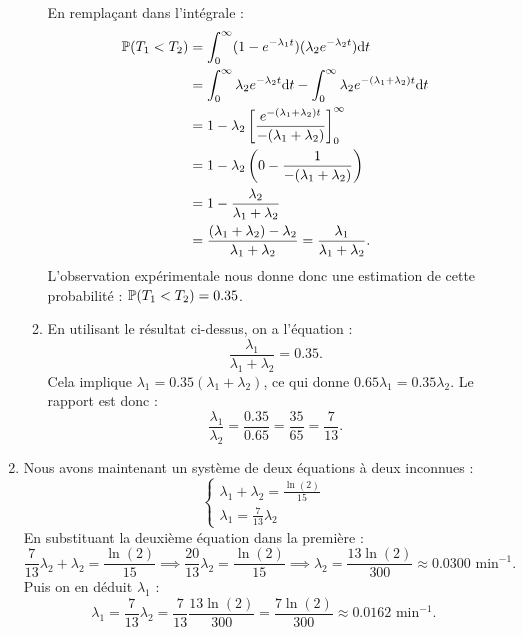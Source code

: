 \documentclass[]{exercices}
\begin{document}
\begin{solution}
\begin{enumerate}
\begin{enumerate}
    En remplaçant dans l'intégrale :
    \begin{align*}
      \P(T_1 < T_2) &= \int_0^\infty (1 - e^{-\lambda_1 t}) (\lambda_2 e^{-\lambda_2 t}) \dd t \\
      &= \int_0^\infty \lambda_2 e^{-\lambda_2 t} \dd t - \int_0^\infty \lambda_2 e^{-(\lambda_1 + \lambda_2)t} \dd t \\
      &= 1 - \lambda_2 \left[ \frac{e^{-(\lambda_1 + \lambda_2)t}}{-(\lambda_1 + \lambda_2)} \right]_0^\infty \\
      &= 1 - \lambda_2 \left( 0 - \frac{1}{-(\lambda_1 + \lambda_2)} \right) \\
      &= 1 - \frac{\lambda_2}{\lambda_1 + \lambda_2} \\
      &= \frac{(\lambda_1 + \lambda_2) - \lambda_2}{\lambda_1 + \lambda_2} = \frac{\lambda_1}{\lambda_1 + \lambda_2}.
    \end{align*}
    L'observation expérimentale nous donne donc une estimation de cette probabilité : $\P(T_1 < T_2) = 0.35$.

    \item En utilisant le résultat ci-dessus, on a l'équation :
    \[ \frac{\lambda_1}{\lambda_1 + \lambda_2} = 0.35. \]
    Cela implique $\lambda_1 = 0.35(\lambda_1 + \lambda_2)$, ce qui donne $0.65 \lambda_1 = 0.35 \lambda_2$.
    Le rapport est donc :
    \[ \frac{\lambda_1}{\lambda_2} = \frac{0.35}{0.65} = \frac{35}{65} = \frac{7}{13}. \]
  \end{enumerate}

    \item Nous avons maintenant un système de deux équations à deux inconnues :
    \[ \begin{cases} \lambda_1 + \lambda_2 = \frac{\ln(2)}{15} \\ \lambda_1 = \frac{7}{13} \lambda_2 \end{cases} \]
    En substituant la deuxième équation dans la première :
    \[ \frac{7}{13} \lambda_2 + \lambda_2 = \frac{\ln(2)}{15} \implies \frac{20}{13} \lambda_2 = \frac{\ln(2)}{15} \implies \lambda_2 = \frac{13 \ln(2)}{300} \approx 0.0300 \text{ min}^{-1}. \]
    Puis on en déduit $\lambda_1$ :
    \[ \lambda_1 = \frac{7}{13} \lambda_2 = \frac{7}{13} \frac{13 \ln(2)}{300} = \frac{7 \ln(2)}{300} \approx 0.0162 \text{ min}^{-1}. \]
\end{enumerate}
\end{solution}
\end{document}
